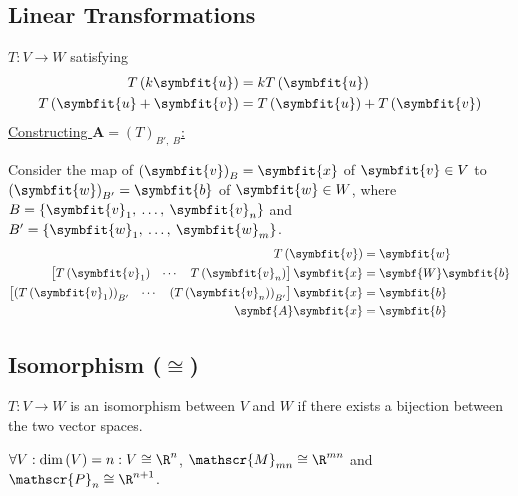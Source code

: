\documentclass{article}
\begin{document}
\begin{multicols*}{3}
    \subsection{Linear Transformations}
    \(T:V \to W\) satisfying
    \begin{align*}
        T\left( k\symbfit{u} \right)              & = k T\left( \symbfit{u} \right)                             \\
        T\left( \symbfit{u} + \symbfit{v} \right) & = T\left( \symbfit{u} \right) + T\left( \symbfit{v} \right)
    \end{align*}
    \underline{Constructing \(\symbf{A} = \left( T \right)_{B',\: B}\):}

    Consider the map of \(\left( \symbfit{v} \right)_B = \symbfit{x}\) of \(\symbfit{v} \in V\) to
    \(\left( \symbfit{w} \right)_{B'} = \symbfit{b}\) of \(\symbfit{w} \in W\),
    where \(B = \left\{ \symbfit{v}_1,\: \dots,\: \symbfit{v}_n \right\}\) and \(B' = \left\{ \symbfit{w}_1,\: \dots,\: \symbfit{w}_m \right\}\).
    \begin{align*}
        T\left( \symbfit{v} \right)                                                                           & = \symbfit{w} \\
        \begin{bmatrix}
            T\left( \symbfit{v}_1 \right) & \cdots & T\left( \symbfit{v}_n \right)
        \end{bmatrix} \symbfit{x}                               & = \symbf{W} \symbfit{b}                                     \\
        \begin{bmatrix}
            \left( T\left( \symbfit{v}_1 \right) \right)_{B'} & \cdots & \left( T\left( \symbfit{v}_n \right) \right)_{B'}
        \end{bmatrix} \symbfit{x} & = \symbfit{b}                  \\
        \symbf{A} \symbfit{x}                                                                                 & = \symbfit{b}
    \end{align*}
    \subsection{Isomorphism (\texorpdfstring{\(\cong\)}{≅})}
    \(T : V \to W\) is an isomorphism between \(V\) and \(W\) if there exists a bijection between the two vector spaces.

    \(\forall V : \dim{\left( V \right)} = n : V \cong \R^n\), \(\mathscr{M}_{mn} \cong \R^{mn}\)
    and \(\mathscr{P}_n \cong \R^{n + 1}\).

\end{multicols*}
\end{document}
